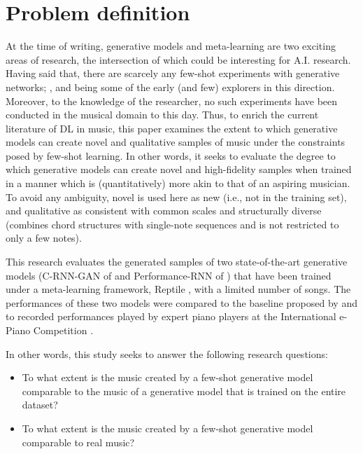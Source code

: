 \documentclass[a4paper]{book}
\begin{document}
\section{Problem definition} \label{sec:thesis_goal}

At the time of writing, generative models and meta-learning are two exciting areas of research, the intersection of which could be interesting for A.I. research. Having said that, there are scarcely any few-shot experiments with generative networks; \textcite{clouatre_figr_2019}, \textcite{dong_musegan_2017} and \textcite{zhang_metagan_2018} being some of the early (and few) explorers in this direction. Moreover, to the knowledge of the researcher, no such experiments have been conducted in the musical domain to this day. Thus, to enrich the current literature of DL in music, this paper examines the extent to which generative models can create novel and qualitative samples of music under the constraints posed by few-shot learning. In other words, it seeks to evaluate the degree to which generative models can create novel and high-fidelity samples when trained in a manner which is (quantitatively) more akin to that of an aspiring musician. To avoid any ambiguity, novel is used here as new (i.e., not in the training set), and qualitative as consistent with common scales and structurally diverse (combines chord structures with single-note sequences and is not restricted to only a few notes).

This research evaluates the generated samples of two state-of-the-art generative models (C-RNN-GAN of \cite{mogren_c-rnn-gan_2016} and Performance-RNN of \cite{oore_this_2018}) that have been trained under a meta-learning framework, Reptile \parencite{nichol_first-order_2018}, with a limited number of songs. The performances of these two models were compared to the baseline proposed by \textcite{larochelle_few-shot_2017} and to recorded performances played by expert piano players at the International e-Piano Competition \parencite{university_of_minnesota_international_2019}.

In other words, this study seeks to answer the following research questions:

\begin{itemize}
    \item To what extent is the music created by a few-shot generative model comparable to the music of a generative model that is trained on the entire dataset?
    \item To what extent is the music created by a few-shot generative model comparable to real music?
\end{itemize}
\end{document}

